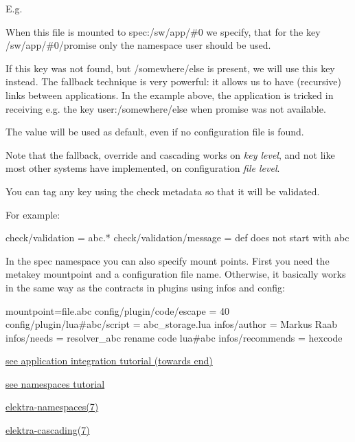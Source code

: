 E.\+g.





\begin{DoxyEnumerate}
\item When this file is mounted to {\ttfamily spec\+:/sw/app/\#0} we specify, that for the key {\ttfamily /sw/app/\#0/promise} only the namespace {\ttfamily user} should be used.
\item If this key was not found, but {\ttfamily /somewhere/else} is present, we will use this key instead. The {\ttfamily fallback} technique is very powerful\+: it allows us to have (recursive) links between applications. In the example above, the application is tricked in receiving e.\+g. the key {\ttfamily user\+:/somewhere/else} when {\ttfamily promise} was not available.
\item The value {} will be used as default, even if no configuration file is found.
\end{DoxyEnumerate}

Note that the fallback, override and cascading works on {\itshape key level}, and not like most other systems have implemented, on configuration {\itshape file level}.

You can tag any key using the {\ttfamily check} metadata so that it will be validated.

For example\+:


\begin{DoxyCode}
check/validation = abc.*
check/validation/message = def does not start with abc
\end{DoxyCode}


In the spec namespace you can also specify mount points. First you need the metakey {\ttfamily mountpoint} and a configuration file name. Otherwise, it basically works in the same way as the contracts in plugins using {\ttfamily infos} and {\ttfamily config}\+:


\begin{DoxyCode}
[]
mountpoint=file.abc
config/plugin/code/escape = 40
config/plugin/lua#abc/script = abc\_storage.lua
infos/author = Markus Raab
infos/needs = resolver\_abc rename code lua#abc
infos/recommends = hexcode
\end{DoxyCode}



\begin{DoxyItemize}
\item \hyperlink{doc_tutorials_application-integration_md}{see application integration tutorial (towards end)}
\item \hyperlink{doc_tutorials_namespaces_md}{see namespaces tutorial}
\item \hyperlink{doc_help_elektra-namespaces_md}{elektra-\/namespaces(7)}
\item \hyperlink{doc_help_elektra-cascading_md}{elektra-\/cascading(7)} 
\end{DoxyItemize}